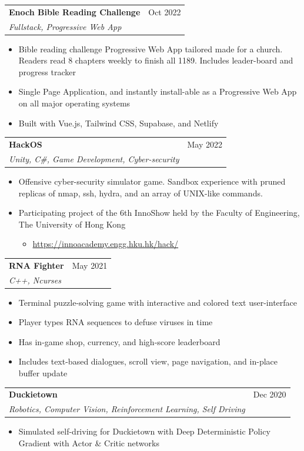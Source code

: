 \documentclass{article}
\newcommand{\jobTitle}[3]{
\vspace{0.4cm}
\begin{tabularx}{0.99\linewidth}{ X r }
    \textbf{#1} & #2\\
    \textit{#3} &
\end{tabularx}
\vspace{0.2cm}
}
\newenvironment{descitemize}
{ \begin{itemize}[leftmargin=1.4cm,,topsep=0pt]
    \setlength{\parskip}{0pt}
    \setlength{\parsep}{0pt}     }
{ \end{itemize}                  }
\begin{document}
\jobTitle
{Enoch Bible Reading Challenge}
{Oct 2022}
{Fullstack, Progressive Web App}
\begin{descitemize}
    \item Bible reading challenge Progressive Web App tailored made for a church. Readers read 8 chapters weekly to finish all 1189. Includes leader-board and progress tracker
	\item Single Page Application, and instantly install-able as a Progressive Web App on all major operating systems
    \item Built with Vue.js, Tailwind CSS, Supabase, and Netlify
\end{descitemize}

\jobTitle
{HackOS}
{May 2022}
{Unity, C\#, Game Development, Cyber-security}
\begin{descitemize}
    \item Offensive cyber-security simulator game. Sandbox experience with pruned replicas of nmap, ssh, hydra, and an array of UNIX-like commands.
    \item Participating project of the 6th InnoShow held by the Faculty of Engineering, The University of Hong Kong
    \begin{itemize}
        \item \href{https://innoacademy.engg.hku.hk/hack/}{https://innoacademy.engg.hku.hk/hack/}
    \end{itemize}
\end{descitemize}

\jobTitle
{RNA Fighter}
{May 2021}
{C++, Ncurses}
\begin{descitemize}
    \item Terminal puzzle-solving game with interactive and colored text user-interface
    \item Player types RNA sequences to defuse viruses in time
	\item Has in-game shop, currency, and high-score leaderboard
	\item Includes text-based dialogues, scroll view, page navigation, and in-place buffer update
\end{descitemize}

\jobTitle
{Duckietown}
{Dec 2020}
{Robotics, Computer Vision, Reinforcement Learning, Self Driving}
\begin{descitemize}
    \item Simulated self-driving for Duckietown with Deep Deterministic Policy Gradient with Actor \& Critic networks
\end{descitemize}
\end{document}

